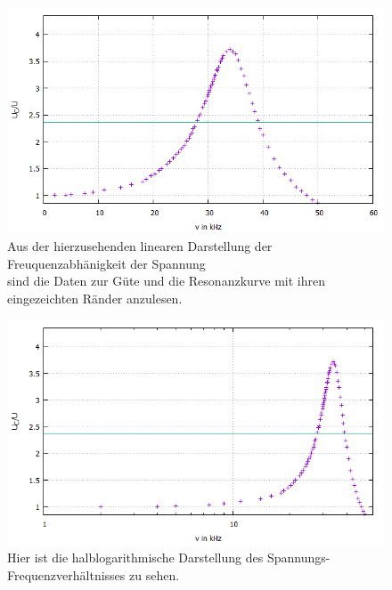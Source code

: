 \begin{figure}
  \centering
  \includegraphics[width=\textwidth]{Linear1.jpeg}
\caption{Aus der hierzusehenden linearen Darstellung der Freuquenzabhänigkeit der Spannung \\ sind die Daten zur Güte und die Resonanzkurve mit ihren eingezeichten Ränder anzulesen.}
\label{fig:Linear1}
\end{figure}
\begin{figure}
  \centering
  \includegraphics[width=\textwidth]{Halblog1.jpeg}
  \caption{Hier ist die halblogarithmische Darstellung des Spannungs-Frequenzverhältnisses zu sehen.}
  \label{fig:Halb1}
\end{figure}

